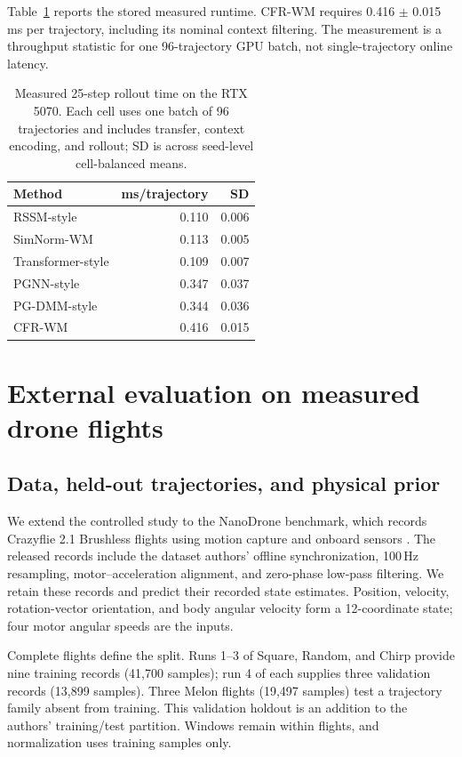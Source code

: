 \documentclass[iicol,pdflatex,sn-basic,Numbered]{sn-jnl}
\newcommand{\CFRLatencyMean}{0.416}
\newcommand{\CFRLatencySD}{0.015}
\begin{document}
Table~\ref{tab:latency} reports the stored measured runtime. CFR-WM requires
\CFRLatencyMean{} $\pm$ \CFRLatencySD{} ms per trajectory, including its
nominal context filtering. The measurement is a throughput statistic for one
96-trajectory GPU batch, not single-trajectory online latency.

\begin{table}[t]
\centering
\caption{Measured 25-step rollout time on the RTX 5070. Each cell uses one
batch of 96 trajectories and includes transfer, context encoding, and rollout;
SD is across seed-level cell-balanced means.}
\label{tab:latency}
\begin{tabular}{lrr}
\toprule
Method & ms/trajectory & SD \\
\midrule
RSSM-style & 0.110 & 0.006 \\
SimNorm-WM & 0.113 & 0.005 \\
Transformer-style & 0.109 & 0.007 \\
PGNN-style & 0.347 & 0.037 \\
PG-DMM-style & 0.344 & 0.036 \\
CFR-WM & 0.416 & 0.015 \\
\bottomrule
\end{tabular}
\end{table}

\section{External evaluation on measured drone flights}
\label{sec:external}

\subsection{Data, held-out trajectories, and physical prior}

We extend the controlled study to the NanoDrone benchmark, which records
Crazyflie 2.1 Brushless flights using motion capture and onboard sensors
\cite{busetto2026_nanodrone}. The released records include the dataset authors'
offline synchronization, 100\,Hz resampling, motor--acceleration alignment,
and zero-phase low-pass filtering. We retain these records and predict their
recorded state estimates. Position, velocity, rotation-vector orientation,
and body angular velocity form a 12-coordinate state; four motor angular
speeds are the inputs.

Complete flights define the split. Runs 1--3 of Square, Random, and Chirp
provide nine training records (41,700 samples); run 4 of each supplies three
validation records (13,899 samples). Three Melon flights (19,497 samples)
test a trajectory family absent from training. This validation holdout is an
addition to the authors' training/test partition. Windows remain within
flights, and normalization uses training samples only.
\end{document}
